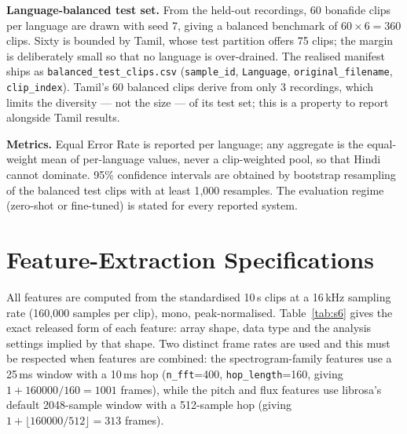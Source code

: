 \documentclass[conference]{IEEEtran}
\begin{document}
\noindent\textbf{Language-balanced test set.} From the held-out recordings, 60 bonafide
clips per language are drawn with seed 7, giving a balanced benchmark of
$60\times6=360$ clips. Sixty is bounded by Tamil, whose test partition offers 75 clips;
the margin is deliberately small so that no language is over-drained. The realised
manifest ships as \texttt{balanced\_test\_clips.csv} (\texttt{sample\_id},
\texttt{Language}, \texttt{original\_filename}, \texttt{clip\_index}). Tamil's 60
balanced clips derive from only 3 recordings, which limits the diversity --- not the
size --- of its test set; this is a property to report alongside Tamil results.

\noindent\textbf{Metrics.} Equal Error Rate is reported per language; any aggregate is
the equal-weight mean of per-language values, never a clip-weighted pool, so that Hindi
cannot dominate. 95\% confidence intervals are obtained by bootstrap resampling of the
balanced test clips with at least 1{,}000 resamples. The evaluation regime (zero-shot or
fine-tuned) is stated for every reported system.

\section{Feature-Extraction Specifications}
\label{sec:featspec}
All features are computed from the standardised 10\,s clips at a 16\,kHz sampling rate
(160{,}000 samples per clip), mono, peak-normalised. Table~\ref{tab:s6} gives the exact
released form of each feature: array shape, data type and the analysis settings implied
by that shape. Two distinct frame rates are used and this must be respected when features
are combined: the spectrogram-family features use a 25\,ms window with a 10\,ms hop
(\texttt{n\_fft}=400, \texttt{hop\_length}=160, giving $1+160000/160=1001$ frames), while
the pitch and flux features use librosa's default 2048-sample window with a 512-sample
hop (giving $1+\lfloor160000/512\rfloor=313$ frames).
\end{document}
